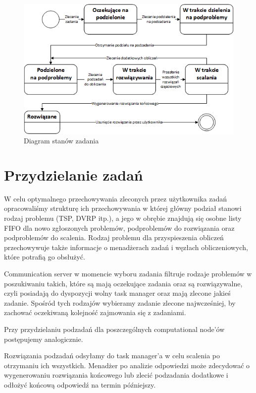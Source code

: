 \documentclass{report}
\begin{document}
	\begin{figure}[h]
		\centering
		\includegraphics[width=\textwidth]{img/state/Task.png}
		\caption{Diagram stanów zadania}
	\end{figure}
	
\section{Przydzielanie zadań}
	W celu optymalnego przechowywania zleconych przez użytkownika zadań opracowaliśmy
	strukturę ich przechowywania w której główny podział stanowi rodzaj problemu
	(TSP, DVRP itp.), a jego w obrębie znajdują się osobne listy FIFO dla nowo zgłoszonych problemów,
	podproblemów do rozwiązania oraz podproblemów do scalenia. Rodzaj problemu dla przyspieszenia obliczeń
	przechowywuje także informacje o menadżerach zadań i węzłach obliczeniowych, które potrafią
	go obsłużyć. 
	
	Communication server w momencie wyboru zadania filtruje rodzaje problemów w poszukiwaniu takich,
	które są mają oczekujące zadania oraz są rozwiązywalne, czyli posiadają do dyspozycji wolny task manager 
	oraz mają zlecone jakieś zadanie. Spośród tych rodzajów wybieramy zadanie zlecone najwcześniej, by zachować
	oczekiwaną kolejność zajmowania się z zadaniami.
	
	Przy przydzielaniu podzadań dla poszczególnych computational node'ów postępujemy analogicznie.
	
	Rozwiązania podzadań odsyłamy do task manager'a w celu scalenia po otrzymaniu ich wszystkich. Menadżer
	po analizie odpowiedzi może zdecydować o wygenerowaniu rozwiązania końcowego lub zlecić podzadania dodatkowe
	i odłożyć końcową odpowiedź na termin późniejszy. 
	
\end{document}
